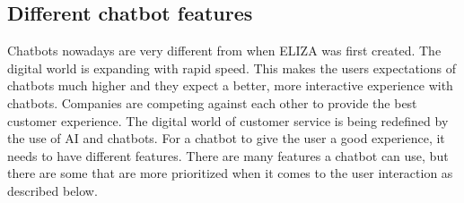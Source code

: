 \subsection{Different chatbot features}
Chatbots nowadays are very different from when ELIZA was first created. The digital world is expanding with rapid speed. This makes the users expectations of chatbots much higher and they expect a better, more interactive experience with chatbots.
Companies are competing against each other to provide the best customer experience. The digital world of customer service is being redefined by the use of AI and chatbots.
For a chatbot to give the user a good experience, it needs to have different features. There are many features a chatbot can use, but there are some that are more prioritized when it comes to the user interaction as described below.

